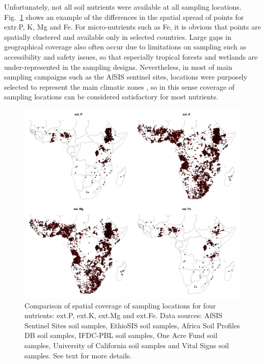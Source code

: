 \begin{linenumbers}
Unfortunately, not all soil nutrients were available at all sampling locations. Fig.\@~\ref{fig:spatial_coverage} shows an example of the differences in the spatial spread of points for extr.\@ P, K, Mg and Fe. For micro-nutrients such as Fe, it is obvious that points are spatially clustered and available only in selected countries. Large gaps in geographical coverage also often occur due to limitations on sampling such as accessibility and safety issues, so that especially tropical forests and wetlands are under-represented in the sampling designs. Nevertheless, in most of main sampling campaigns such as the AfSIS sentinel sites, locations were purposely selected to represent the main climatic zones \citep{Vagen2010AfSIS}, so in this sense coverage of sampling locations can be considered satisfactory for most nutrients. \par

\clearpage

\begin{figure}[!hp]
\includegraphics[width=\textwidth]{Fig_AfNutrients_spatial_coverage.png}
\caption{Comparison of spatial coverage of sampling locations for four nutrients: ext.\@ P, ext.\@ K, ext.\@ Mg and ext.\@ Fe. Data sources: AfSIS Sentinel Sites soil samples, EthioSIS soil samples, Africa Soil Profiles DB soil samples, IFDC-PBL soil samples, One Acre Fund soil samples, University of California soil samples and Vital Signs soil samples. See text for more details.}
\label{fig:spatial_coverage}
\end{figure}


\end{linenumbers}
